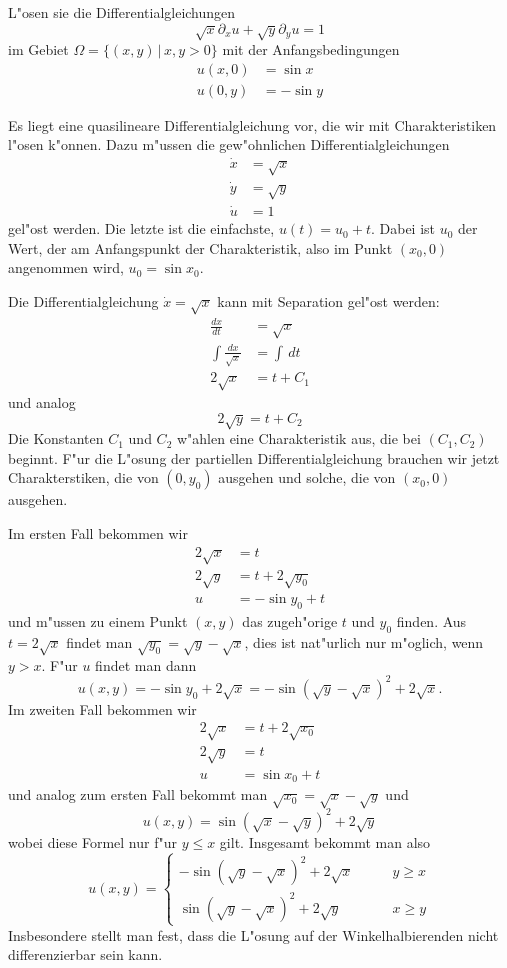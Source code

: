 L"osen sie die Differentialgleichungen
\[
\sqrt{x}\partial_x u+\sqrt{y}\partial_yu=1
\]
im Gebiet $\Omega=\{(x,y)\,|\, x,y>0\}$
mit der Anfangsbedingungen
\begin{align*}
u(x,0)&=\sin x\\
u(0,y)&=-\sin y
\end{align*}

\begin{loesung}
Es liegt eine quasilineare Differentialgleichung vor, die wir mit
Charakteristiken l"osen k"onnen. Dazu m"ussen die gew"ohnlichen
Differentialgleichungen
\begin{align*}
\dot x &=\sqrt{x} \\
\dot y &=\sqrt{y} \\
\dot u &=1
\end{align*}
gel"ost werden. Die letzte ist die einfachste, $u(t)=u_0 + t$. Dabei
ist $u_0$ der Wert, der am Anfangspunkt der Charakteristik, also
im Punkt $(x_0,0)$ angenommen wird, $u_0=\sin x_0$.

Die Differentialgleichung $\dot x=\sqrt{x}$ kann mit Separation
gel"ost werden:
\begin{align*}
\frac{dx}{dt}&=\sqrt{x}\\
\int\frac{dx}{\sqrt{x}}&=\int\,dt\\
2\sqrt{x}&=t+C_1
\end{align*}
und analog
\[
2\sqrt{y}=t+C_2
\]
Die Konstanten $C_1$ und $C_2$ w"ahlen eine Charakteristik aus,
die bei $(C_1,C_2)$ beginnt.
F"ur die L"osung der partiellen Differentialgleichung brauchen wir
jetzt Charakterstiken, die von $(0,y_0)$  ausgehen und solche, die
von $(x_0,0)$ ausgehen.

Im ersten Fall bekommen wir
\begin{align*}
2\sqrt{x}&=t\\
2\sqrt{y}&=t+2\sqrt{y_0}\\
u&=-\sin y_0 + t
\end{align*}
und m"ussen zu einem Punkt $(x,y)$ das zugeh"orige $t$ und $y_0$
finden.
Aus $t=2\sqrt{x}$ findet man $\sqrt{y_0}=\sqrt{y}-\sqrt{x}$, dies
ist nat"urlich nur m"oglich, wenn $y>x$. F"ur $u$ findet man dann
\[
u(x,y)=-\sin y_0+2\sqrt{x}=-\sin(\sqrt{y}-\sqrt{x})^2 +2\sqrt{x}.
\]
Im zweiten Fall bekommen wir
\begin{align*}
2\sqrt{x}&=t+2\sqrt{x_0}\\
2\sqrt{y}&=t\\
u&=\sin x_0+t
\end{align*}
und analog zum ersten Fall bekommt man $\sqrt{x_0}=\sqrt{x}-\sqrt{y}$
und
\[
u(x,y)=\sin(\sqrt{x}-\sqrt{y})^2+2\sqrt{y}
\]
wobei diese Formel nur f"ur $y\le x$ gilt. Insgesamt bekommt man also
\[
u(x,y)=
\begin{cases}
-\sin(\sqrt{y}-\sqrt{x})^2 +
2\sqrt{x}&\qquad y \ge x\\
\sin(\sqrt{y}-\sqrt{x})^2 +
2\sqrt{y}&\qquad x \ge y
\end{cases}
\]
Insbesondere stellt man fest, dass die L"osung auf der Winkelhalbierenden
nicht differenzierbar sein kann.


\end{loesung}
